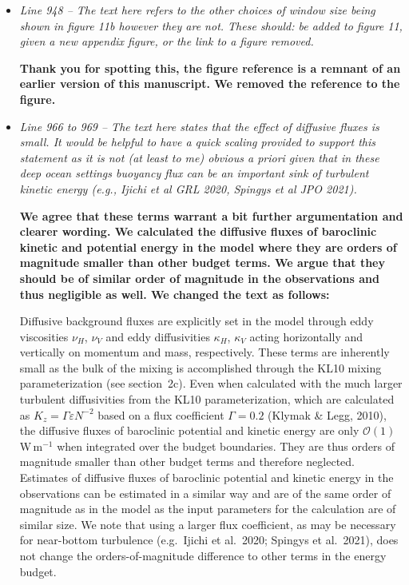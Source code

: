 \documentclass[11pt]{article}
\begin{document}
\begin{flushleft}
\begin{itemize}
\item \textit{Line 948 -- The text here refers to the other choices of window size being shown in figure 11b however they are not. These should: be added to figure 11, given a new appendix figure, or the link to a figure removed.}

\textbf{Thank you for spotting this, the figure reference is a remnant of an earlier version of this manuscript. We removed the reference to the figure.}

\item \textit{Line 966 to 969 -- The text here states that the effect of diffusive fluxes is small. It would be helpful to have a quick scaling provided to support this statement as it is not (at least to me) obvious a priori given that in these deep ocean settings buoyancy flux can be an important sink of turbulent kinetic energy (e.g., Ijichi et al GRL 2020, Spingys et al JPO 2021).}

\textbf{We agree that these terms warrant a bit further argumentation and clearer wording. We calculated the diffusive fluxes of baroclinic kinetic and potential energy in the model where they are orders of magnitude smaller than other budget terms. We argue that they should be of similar order of magnitude in the observations and thus negligible as well. We changed the text as follows:}

\textnormal{Diffusive background fluxes are explicitly set in the model through eddy viscosities $\nu_H$, $\nu_V$ and eddy diffusivities $\kappa_H$, $\kappa_V$ acting horizontally and vertically on momentum and mass, respectively.
These terms are inherently small as the bulk of the mixing is accomplished through the KL10 mixing parameterization (see section~2c).
Even when calculated with the much larger turbulent diffusivities from the KL10 parameterization, which are calculated as $K_z = \Gamma \varepsilon N^{-2}$ based on a flux coefficient $\Gamma=0.2$ (Klymak \& Legg, 2010), the diffusive fluxes of baroclinic potential and kinetic energy are only $\mathcal{O}(1)$\,W\,m$^{-1}$ when integrated over the budget boundaries.
They are thus orders of magnitude smaller than other budget terms and therefore neglected.
Estimates of diffusive fluxes of baroclinic potential and kinetic energy in the observations can be estimated in a similar way and are of the same order of magnitude as in the model as the input parameters for the calculation are of similar size.
We note that using a larger flux coefficient, as may be necessary for near-bottom turbulence (e.g.~Ijichi et al.~2020; Spingys et al.~2021), does not change the orders-of-magnitude difference to other terms in the energy budget.}
\end{itemize}


\end{flushleft}
\end{document}
